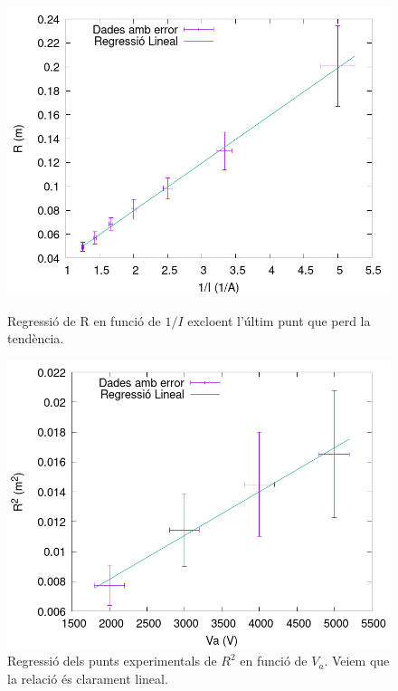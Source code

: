 \documentclass[11pt]{article}
\begin{document}
\begin{figure}[h]
    \centering
    \begin{minipage}{0.45\textwidth}
        \centering
        \includegraphics[width=\textwidth]{RvsI.png}
        \caption{Regressió de R en funció de $1/I$ excloent l'últim punt que perd la tendència.}
        \label{fig: RvsI}
    \end{minipage}
    \hfill
    \begin{minipage}{0.45\textwidth} 
        \centering
        \includegraphics[width=\textwidth]{RvsVa.png}
        \caption{Regressió dels punts experimentals de $R^2$ en funció de $V_a$. Veiem que la relació és clarament lineal.}
        \label{fig: RvsVa}
    \end{minipage}
\end{figure}
\end{document}
